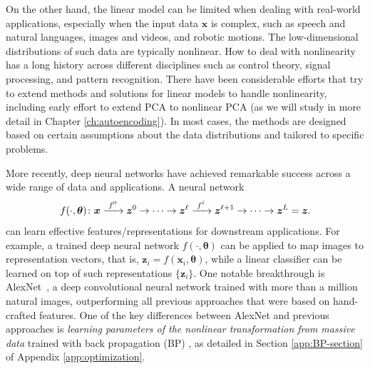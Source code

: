 \documentclass[../../book-main.tex]{subfiles}
\begin{document}
On the other hand, the linear model can be limited when dealing with real-world applications, especially when the input data $\bm{x}$ is complex, such as speech and natural languages, images and videos, and robotic motions. The low-dimensional distributions of such data are typically nonlinear. 
How to deal with nonlinearity has a long history across different disciplines such as control theory, signal processing, and pattern recognition.  There have been considerable efforts that try to extend methods and solutions for linear models to handle nonlinearity, including early effort to extend PCA to nonlinear PCA (as we will study in more detail in Chapter \ref{ch:autoencoding}).  In most cases, the methods are designed based on certain assumptions about the data distributions and tailored to specific problems. 

More recently, deep neural networks have achieved remarkable success across a wide range of data and applications. A neural network
\begin{equation}
  f(\cdot, \bm \theta) \colon \bm{x}
  \xrightarrow{\hspace{1mm} f^0 \hspace{1mm}} \bm{z}^0 \rightarrow \cdots
  \rightarrow \bm{z}^\ell \xrightarrow{\hspace{1mm} f^\ell \hspace{1mm}}
  \bm{z}^{\ell+1} \rightarrow  \cdots \to \bm{z}^L = \bm{z}.
\end{equation}
can learn effective features/representations for downstream applications. For example, a trained deep neural network $f(\cdot, \bm \theta)$ can be applied to map images to representation vectors, that is, $\bm{z}_i = f(\bm{x}_i,\bm \theta)$, while a linear classifier can be learned on top of such representations $\{\bm{z}_i\}$. One notable breakthrough is AlexNet~\cite{krizhevsky2012imagenet}, a deep convolutional neural network trained with more than a million natural images, outperforming all previous approaches that were based on hand-crafted features. One of the key differences between AlexNet and previous approaches is \textit{learning parameters of the nonlinear transformation from massive data} trained with back propagation (BP) \cite{Back-Prop}, as detailed in Section \ref{app:BP-section} of Appendix \ref{app:optimization}. 


\end{document}
